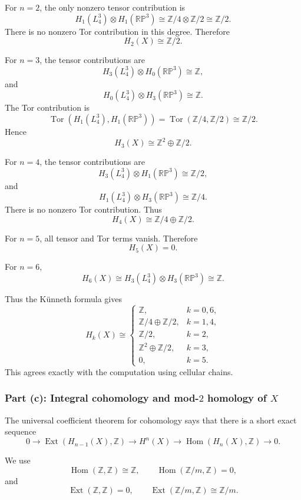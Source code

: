 \documentclass[12pt,a4paper]{article}
\theoremstyle{notespace}
\begin{document}
For \(n=2\), the only nonzero tensor contribution is
\[
H_1(L_4^3)\otimes H_1(\mathbb{RP}^3)
\cong
\mathbb Z/4\otimes \mathbb Z/2
\cong
\mathbb Z/2.
\]
There is no nonzero Tor contribution in this degree. Therefore
\[
H_2(X)\cong \mathbb Z/2.
\]

For \(n=3\), the tensor contributions are
\[
H_3(L_4^3)\otimes H_0(\mathbb{RP}^3)
\cong
\mathbb Z,
\]
and
\[
H_0(L_4^3)\otimes H_3(\mathbb{RP}^3)
\cong
\mathbb Z.
\]
The Tor contribution is
\[
\operatorname{Tor}(H_1(L_4^3),H_1(\mathbb{RP}^3))
=
\operatorname{Tor}(\mathbb Z/4,\mathbb Z/2)
\cong
\mathbb Z/2.
\]
Hence
\[
H_3(X)
\cong
\mathbb Z^2\oplus \mathbb Z/2.
\]

For \(n=4\), the tensor contributions are
\[
H_3(L_4^3)\otimes H_1(\mathbb{RP}^3)
\cong
\mathbb Z/2,
\]
and
\[
H_1(L_4^3)\otimes H_3(\mathbb{RP}^3)
\cong
\mathbb Z/4.
\]
There is no nonzero Tor contribution. Thus
\[
H_4(X)
\cong
\mathbb Z/4\oplus \mathbb Z/2.
\]

For \(n=5\), all tensor and Tor terms vanish. Therefore
\[
H_5(X)=0.
\]

For \(n=6\),
\[
H_6(X)
\cong
H_3(L_4^3)\otimes H_3(\mathbb{RP}^3)
\cong
\mathbb Z.
\]

Thus the Künneth formula gives
\[
\boxed{
	H_k(X)\cong
	\begin{cases}
		\mathbb Z, & k=0,6,\\[1mm]
		\mathbb Z/4\oplus \mathbb Z/2, & k=1,4,\\[1mm]
		\mathbb Z/2, & k=2,\\[1mm]
		\mathbb Z^2\oplus \mathbb Z/2, & k=3,\\[1mm]
		0, & k=5.
\end{cases}}
\]
This agrees exactly with the computation using cellular chains.

\subsubsection{Part (c): Integral cohomology and mod-\(2\) homology of \(X\)}

The universal coefficient theorem for cohomology says that there is a short exact sequence
\[
0
\longrightarrow
\operatorname{Ext}(H_{n-1}(X),\mathbb Z)
\longrightarrow
H^n(X)
\longrightarrow
\operatorname{Hom}(H_n(X),\mathbb Z)
\longrightarrow
0.
\]

We use
\[
\operatorname{Hom}(\mathbb Z,\mathbb Z)\cong \mathbb Z,
\qquad
\operatorname{Hom}(\mathbb Z/m,\mathbb Z)=0,
\]
and
\[
\operatorname{Ext}(\mathbb Z,\mathbb Z)=0,
\qquad
\operatorname{Ext}(\mathbb Z/m,\mathbb Z)\cong \mathbb Z/m.
\]
\end{document}
